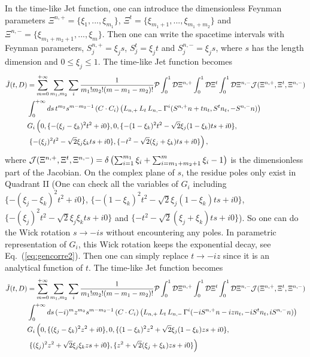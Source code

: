 \documentclass[a4paper,11pt]{article}
\begin{document}
In the time-like Jet function, one can introduce the dimensionless Feynman parameters $\Xi^{n,+}=\{\xi_1,...,\xi_{m_1}\}$, $\Xi^{t}=\{\xi_{m_1+1},...,\xi_{m_1+m_2}\}$ and $\Xi^{n,-}=\{\xi_{m_1+m_2+1},...,\xi_{m}\}$. Then one can write the spacetime intervals with Feynman parameters, $S^{n,+}_{j}=\xi_j s$, $S^{t}_j=\xi_j t$ and $S^{n,-}_j=\xi_j s$, where $s$ has the length dimension and $0 \leq \xi_j \leq 1$. The time-like Jet function becomes
\begin{align}
\tilde J(t,D)&=\sum_{m=0}^{+\infty} \sum_{m_1,m_2} \sum_{i} \frac{1}{m_1! m_2! (m-m_1-m_2)!} {\cal P} \int^{1}_{0} {\cal D} \Xi^{n,+} 
\int^{1}_{0} {\cal D} \Xi^{t}
\int^{1}_{0} {\cal D} \Xi^{n,-}
{\cal J}(\Xi^{n,+},\Xi^{t},\Xi^{n,-})
\nonumber\\
&\int^{+\infty}_{0} ds \, t^{m_2} s^{m-m_2-1} \left(C \cdot C_{i}\right) \left(L_{n,+}\, L_{t} \, L_{n,-} \, \Gamma^{i}(S^{n,+} n + t n_t,S^{t} n_t,-S^{n,-} n)\right) \nonumber\\ 
&G_{i}\left(0,
\{-(\xi_j-\xi_k)^2 t^2+i0\}, 
0,
\{-(1 - \xi_k)^2 t^2 -\sqrt{2} \xi_j (1-\xi_k) t s+i0\}, \right. \nonumber\\
& \left. \{-(\xi_j)^2 t^2 - \sqrt{2} \xi_j \xi_k t s+i0\},
\{-t^2-\sqrt{2} (\xi_j + \xi_k ) t s+i0\} \right),
\end{align}
where ${\cal J}(\Xi^{n,+},\Xi^{t},\Xi^{n,-})=\delta\left(\sum_{i=1}^{m_1}\xi_i+\sum_{i=m_1+m_2+1}^{m}\xi_i-1\right)$ is the dimensionless part of the Jacobian. On the complex plane of $s$, the residue poles only exist in Quadrant II (One can check all the variables of $G_i$ including $\{-(\xi_j-\xi_k)^2 t^2+i0\}$, $\{-(1 - \xi_k)^2 t^2 -\sqrt{2} \xi_j (1-\xi_k) t s+i0\}$, $\{-(\xi_j)^2 t^2 - \sqrt{2} \xi_j \xi_k t s+i0\}$ and $\{-t^2-\sqrt{2} (\xi_j + \xi_k ) t s+i0\}$). So one can do the Wick rotation $s \rightarrow -i s$ without encountering any poles. In parametric representation of $G_i$, this Wick rotation keeps the exponential decay, see Eq.~(\ref{eq:gencorre2}). Then one can simply replace $t \rightarrow -i z$ since it is an analytical function of $t$. The time-like Jet function becomes 
\begin{align}
\tilde J(t,D)&=\sum_{m=0}^{+\infty} \sum_{m_1,m_2} \sum_{i} \frac{1}{m_1! m_2! (m-m_1-m_2)!} {\cal P} \int^{1}_{0} {\cal D} \Xi^{n,+} 
\int^{1}_{0} {\cal D} \Xi^{t}
\int^{1}_{0} {\cal D} \Xi^{n,-}
{\cal J}(\Xi^{n,+},\Xi^{t},\Xi^{n,-})
\nonumber\\
&\int^{+\infty}_{0} ds \, (-i)^{m} z^{m_2} s^{m-m_2-1} \left(C \cdot C_{i}\right) \left(L_{n,+}\, L_{t} \, L_{n,-} \, \Gamma^{i}(-i S^{n,+} n-i z n_t,-i S^{t} n_t,i S^{n,-} n)\right) \nonumber\\ 
&G_{i}\left(0,
\{(\xi_j-\xi_k)^2 z^2+i0\}, 
0,
\{(1 - \xi_k)^2 z^2 + \sqrt{2} \xi_j (1-\xi_k) z s+i0\}, \right. \nonumber\\
& \left. \{(\xi_j)^2 z^2 + \sqrt{2} \xi_j \xi_k z s+i0\},
\{z^2+\sqrt{2} (\xi_j + \xi_k ) z s+i0\} \right)
\end{align}
\end{document}
